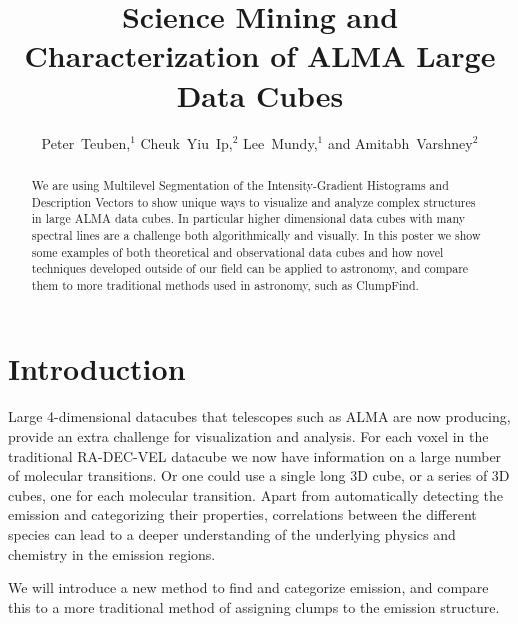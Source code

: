 
\resetcounters


\title{Science Mining and Characterization of ALMA Large Data Cubes}
\author{Peter~Teuben,$^1$ Cheuk~Yiu~Ip,$^2$ Lee~Mundy,$^1$ and Amitabh~Varshney$^2$
}


\begin{abstract}
We are using Multilevel Segmentation of the Intensity-Gradient Histograms and Description Vectors to show unique ways to visualize and analyze complex structures in large ALMA data cubes. In particular higher dimensional data cubes with many spectral lines are a challenge both algorithmically and visually. In this poster we show some examples of both theoretical and observational data cubes and how novel techniques developed outside of our field can be applied to astronomy, and compare them to more traditional methods used in astronomy, such as ClumpFind.
\end{abstract}

\section{Introduction}

Large 4-dimensional datacubes that telescopes such as ALMA are now producing, provide an extra challenge for visualization and analysis. For each voxel in the traditional RA-DEC-VEL datacube we now have information on a large number of molecular transitions. Or one could use a single long 3D cube, or a series of 3D cubes, one for each molecular transition. Apart from automatically detecting the emission and categorizing their properties, correlations between the different species can lead to a deeper understanding of the underlying physics and chemistry in the emission regions.

We will introduce a new method to find and categorize emission, and compare this to a more traditional method of assigning clumps to the emission structure.

